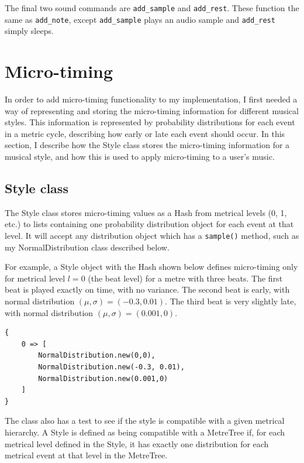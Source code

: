 \documentclass[12pt,twoside,openright]{report}
\begin{document}
The final two sound commands are \verb'add_sample' and \verb'add_rest'. These function the
same as \verb'add_note', except \verb'add_sample' plays an audio sample and \verb'add_rest' simply sleeps.



\section{Micro-timing} \label{micro-timing_implementation}

In order to add micro-timing functionality to my implementation, I first needed
a way of representing and storing the micro-timing information for different
musical styles. This information is represented by probability distributions for
each event in a metric cycle, describing how early or late each event should
occur. In this section, I describe how the
Style class stores the micro-timing information for a musical style, and how
this is used to apply micro-timing to a user's music.


\subsection{Style class} \label{style_class}

The Style class stores micro-timing values as a Hash from metrical levels (0, 1,
etc.) to lists containing one probability distribution object for each event at
that level. It will accept any distribution object which has a \verb'sample()' method,
such as my NormalDistribution class described below.

For example, a Style object with the Hash shown below defines micro-timing only for metrical level
$l=0$ (the beat level) for a metre with three beats. The first beat is played exactly on time,
with no variance. The second beat is early, with normal distribution $(\mu,\sigma)=(-0.3,0.01)$.
The third beat is very slightly late, with normal distribution $(\mu,\sigma)=(0.001,0)$.

\begin{verbatim}
{
    0 => [
        NormalDistribution.new(0,0),
        NormalDistribution.new(-0.3, 0.01),
        NormalDistribution.new(0.001,0)
    ]
}
\end{verbatim}

The class also has a test to see if the style is compatible with a given metrical
hierarchy. A Style is defined as being compatible with a MetreTree if, for each
metrical level defined in the Style, it has exactly one distribution for each
metrical event at that level in the MetreTree.
\end{document}
